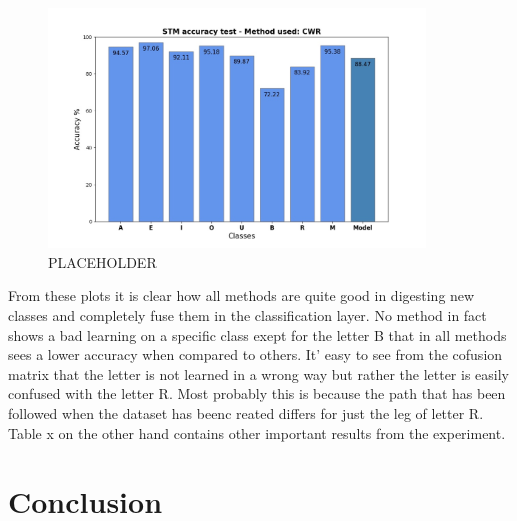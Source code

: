 \documentclass[12pt]{report}
\begin{document}
%
%
\begin{figure}[h!]
    \centering
    \includegraphics[width=100mm]{Figures/Chapter5/STM_barPlot_CWR.jpg} 
    \caption{PLACEHOLDER}
    \label{fig:letter_res_CWR}    
\end{figure}
%
From these plots it is clear how all methods are quite good in digesting new classes and completely fuse them in the classification layer. No method in fact shows a bad learning on a specific class exept for the letter B that in all methods sees a lower accuracy when compared to others. It' easy to see from the cofusion matrix that the letter is not learned in a wrong way but rather the letter is easily confused with the letter R. Most probably this is because the path that has been followed when the dataset has beenc reated differs for just the leg of letter R. \\
Table x on the other hand contains other important results from the experiment. 



\chapter{Conclusion}














\end{document}

